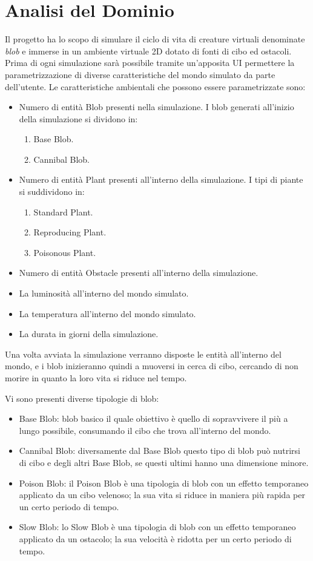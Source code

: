 \section{Analisi del Dominio}

Il progetto ha lo scopo di simulare il ciclo di vita di creature virtuali denominate \textit{blob} e immerse in un ambiente virtuale 2D dotato di fonti di cibo ed ostacoli.
Prima di ogni simulazione sarà possibile tramite un'apposita UI permettere la parametrizzazione di diverse caratteristiche del mondo simulato da parte dell'utente.
Le caratteristiche ambientali che possono essere parametrizzate sono:
\begin{itemize}
    \item Numero di entità Blob presenti nella simulazione. I blob generati all'inizio della simulazione si dividono in:
    \begin{enumerate}
        \item Base Blob.
        \item Cannibal Blob.
    \end{enumerate}
    \item Numero di entità Plant presenti all'interno della simulazione. I tipi di piante si suddividono in:
    \begin{enumerate}
        \item Standard Plant.
        \item Reproducing Plant.
        \item Poisonous Plant.
    \end{enumerate}
    \item Numero di entità Obstacle presenti all'interno della simulazione.
    \item La luminosità all'interno del mondo simulato.
    \item La temperatura all'interno del mondo simulato.
    \item La durata in giorni della simulazione.
\end{itemize}

Una volta avviata la simulazione verranno disposte le entità all'interno del mondo, e i blob inizieranno quindi a muoversi in cerca di cibo, cercando di non morire in quanto la loro vita si riduce nel tempo. 

Vi sono presenti diverse tipologie di blob:
\begin{itemize}
    \item Base Blob: blob basico il quale obiettivo è quello di sopravvivere il più a lungo possibile, consumando il cibo che trova all'interno del mondo.
    \item Cannibal Blob: diversamente dal Base Blob questo tipo di blob può nutrirsi di cibo e degli altri Base Blob, se questi ultimi hanno una dimensione minore.
    \item Poison Blob: il Poison Blob è una tipologia di blob con un effetto temporaneo applicato da un cibo velenoso; la sua vita si riduce in maniera più rapida per un certo periodo di tempo.
    \item Slow Blob: lo Slow Blob è una tipologia di blob con un effetto temporaneo applicato da un ostacolo; la sua velocità è ridotta per un certo periodo di tempo.
\end{itemize}

